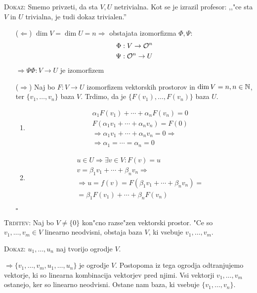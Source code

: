 \textsc{Dokaz:} Smemo privzeti, da sta $V, U$ netrivialna. Kot se je izrazil profesor: ,,"ce sta $V$ in $U$ trivialna, je tudi dokaz trivialen.''
\begin{itemize}
	\item[($\Leftarrow$)] $\dim V = \dim U = n \Rightarrow$ obstajata izomorfizma  $\Phi, \Psi$:
	\begin{align*}
	\Phi &: V \to \mathcal{O}^n \\
	\Psi &: \mathcal{O}^n \to U
	\end{align*}
	$\Rightarrow \Psi \Phi: V \to U$ je izomorfizem
	
	\item[($\Rightarrow$)] Naj bo $F: V \to U$ izomorfizem vektorskih prostorov in $\dim V = n, n \in \mathbb{N}$, ter $\{v_1, \ldots, v_n\}$ baza $V$. Trdimo, da je $\{F(v_1), \ldots, F(v_n)\}$ baza $U$.
	\begin{enumerate}
		\item {}
		\begin{gather*}
			\alpha_1 F(v_1) + \cdots + \alpha_n F(v_n) = 0 \\
			F(\alpha_1 v_1 + \cdots + \alpha_n v_n) = F(0) \\
			\Rightarrow \alpha_1 v_1 + \cdots + \alpha_n v_n = 0 \Rightarrow \\
			\Rightarrow \alpha_1 = \cdots = \alpha_n = 0
		\end{gather*}
		
		\item {}
		\begin{gather*}
			u \in U \Rightarrow \exists v \in V: F(v) = u \\
			v = \beta_1 v_1 + \cdots + \beta_n v_n \Rightarrow \\
			\Rightarrow u = f(v) = F(\beta_1 v_1 + \cdots + \beta_n v_n) = \\
			= \beta_1 F(v_1) + \cdots + \beta_n F(v_n)
		\end{gather*}
	\end{enumerate}
	\hfill $\square$
\end{itemize}
%
\textsc{Trditev:} Naj bo $V \neq \{0\}$ kon"cno razse"zen vektorski prostor. "Ce so $v_1, \ldots, v_m \in V$ linearno neodvisni, obstaja baza $V$, ki vsebuje $v_1, \ldots, v_m$.

\textsc{Dokaz:} $u_1, \ldots, u_n$ naj tvorijo ogrodje $V$.

$\Rightarrow \{v_1, \ldots, v_m, u_1, \ldots, u_n\}$ je ogrodje $V$. Postopoma iz tega ogrodja odtranjujemo vektorje, ki so linearna kombinacija vektorjev pred njimi. Vsi vektorji $v_1, \ldots, v_m$ ostanejo, ker so linearno neodvisni. Ostane nam baza, ki vsebuje $\{v_1, \ldots, v_n\}$.

